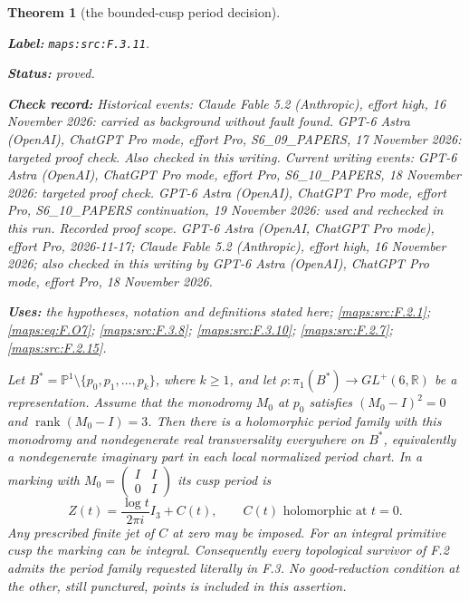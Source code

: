 \documentclass[11pt,a4paper]{article}
\newtheorem{theorem}{Theorem}[section]
\theoremstyle{definition}
\newcommand{\StatementRecord}[4]{\par\smallskip\begingroup\upshape\raggedright\noindent\textbf{Label:} \nolinkurl{#1}.\par\noindent\textbf{Status:} #2.\par\noindent\textbf{Check record:} #3.\par\noindent\textbf{Uses:} #4.\par\endgroup\smallskip}
\begin{document}
\begin{theorem}[the bounded-cusp period decision]\label{maps:src:F.3.11}
\StatementRecord{maps:src:F.3.11}{proved}{Historical events: Claude Fable 5.2 (Anthropic), effort high, 16 November 2026: carried as background without fault found. GPT-6 Astra (OpenAI), ChatGPT Pro mode, effort Pro, S6\_09\_PAPERS, 17 November 2026: targeted proof check. Also checked in this writing. Current writing events: GPT-6 Astra (OpenAI), ChatGPT Pro mode, effort Pro, S6\_10\_PAPERS, 18 November 2026: targeted proof check. GPT-6 Astra (OpenAI), ChatGPT Pro mode, effort Pro, S6\_10\_PAPERS continuation, 19 November 2026: used and rechecked in this run. \emph{Recorded proof scope.} GPT-6 Astra (OpenAI, ChatGPT Pro mode), effort Pro, 2026-11-17; Claude Fable 5.2 (Anthropic), effort high, 16 November 2026; also checked in this writing by GPT-6 Astra (OpenAI), ChatGPT Pro mode, effort Pro, 18 November 2026}{the hypotheses, notation and definitions stated here; \cref{maps:src:F.2.1}; \cref{maps:eq:F.O7}; \cref{maps:src:F.3.8}; \cref{maps:src:F.3.10}; \cref{maps:src:F.2.7}; \cref{maps:src:F.2.15}}


Let
$B^*=\mathbb P^1\setminus\{p_0,p_1,\ldots,p_k\}$,
where $k\ge1$, and let
$\rho:\pi_1(B^*)\to GL^+(6,\mathbb R)$ be a representation.
Assume that the monodromy $M_0$ at $p_0$ satisfies
$(M_0-I)^2=0$ and $\operatorname{rank}(M_0-I)=3$.
Then there is a holomorphic period family with this monodromy
and nondegenerate real transversality everywhere on $B^*$,
equivalently a nondegenerate imaginary part in each local
normalized period chart.
In a marking with $M_0=\left(\begin{smallmatrix}I&I\\0&I\end{smallmatrix}\right)$
its cusp period is
\[
 Z(t)=\frac{\log t}{2\pi i}I_3+C(t),
 \qquad C(t)\text{ holomorphic at }t=0.
 \tag{F.O6}\label{maps:eq:F.O6}
\]
Any prescribed finite jet of $C$ at zero may be imposed.
For an integral primitive cusp the marking can be integral.
Consequently every topological survivor of F.2 admits the
period family requested literally in F.3.  No good-reduction
condition at the other, still punctured, points is included
in this assertion.

\end{theorem}
\end{document}
